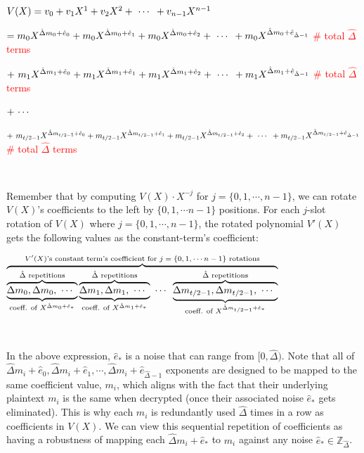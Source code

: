 $ $

$V(X) = v_0 + v_1X^1 + v_2X^2 + \text{ } \text{$\cdots$} \text{ } + v_{n-1}X^{n-1}$

\text{ } $= m_0X^{\hat{\Delta} m_0 + \hat{e}_0} + m_0X^{\hat{\Delta} m_0 + \hat{e}_1} + m_0X^{\hat{\Delta} m_0 + \hat{e}_2} + \text{ } \text{$\cdots$} \text{ } +  m_0X^{\hat{\Delta} m_0 + \hat{e}_{\hat{\Delta} - 1}}$ \textcolor{red}{ \# total $\hat{\Delta}$ terms}

\text{ } $ + \text{ } m_1X^{\hat{\Delta} m_1 + \hat{e}_0} + m_1X^{\hat{\Delta} m_1 + \hat{e}_1} + m_1X^{\hat{\Delta} m_1 + \hat{e}_2} + \text{ } \text{$\cdots$} \text{ } + m_1X^{\hat{\Delta} m_1 + \hat{e}_{\hat{\Delta} - 1}}$ \textcolor{red}{ \# total $\hat{\Delta}$ terms}

\text{ } $ + \text{ } \text{$\cdots$} \text{ } $

\text{ } $ + \text{ } m_{t/2 - 1}X^{\hat{\Delta} m_{t/2 - 1} + \hat{e}_0} + m_{t/2 - 1}X^{\hat{\Delta} m_{t/2 - 1} + \hat{e}_1} + m_{t/2 - 1}X^{\hat{\Delta} m_{t/2 - 1} + \hat{e}_2} + \text{ } \text{$\cdots$} \text{ } + m_{t/2 - 1}X^{\hat{\Delta} m_{t/2 - 1} + \hat{e}_{\hat{\Delta} - 1}}$ \textcolor{red}{ \# total $\hat{\Delta}$ terms}

$ $


Remember that by computing $V(X)\cdot X^{-j}$ for  $j= \{0, 1, \cdots , n-1\}$, we can rotate $V(X)$'s coefficients to the left by $\{0, 1, \cdots n-1 \}$ positions. For each $j$-slot rotation of $V(X)$ where $j= \{0, 1, \cdots , n-1\}$, the rotated polynomial $V'(X)$ gets the following values as the constant-term's coefficient: 

$\overbrace{\overbrace{\underbrace{\Delta m_0, \Delta m_0, \text{ } \text{$\cdots$} \text{ }}_{\text{coeff. of } X^{\hat{\Delta}m_0 + \hat{e}_*}}}^{\hat{\Delta} \text{ repetitions}} \overbrace{\underbrace{\Delta m_1, \Delta m_1, \text{ } \text{$\cdots$} \text{ }}_{\text{coeff. of } X^{\hat{\Delta}m_1 + \hat{e}_*}}}^{\hat{\Delta} \text{ repetitions}} \text{ } \text{$\cdots$} \text{ } \overbrace{\underbrace{\Delta m_{{t}/{2}-1}, \Delta m_{{t}/{2}-1}, \text{ } \text{$\cdots$} \text{ }}_{\text{coeff. of } X^{\hat{\Delta}m_{{t}/{2}-1}+ \hat{e}_*} }}^{\hat{\Delta} \text{ repetitions}}}^{\text{$V'(X)$'s constant term's coefficient for $j = \{0, 1, \cdots n-1\}$ rotations}}$ 



$ $

In the above expression, $\hat{e}_*$ is a noise that can range from $[0, \hat{\Delta})$. Note that all of $\hat\Delta m_i + \hat{e}_0, \hat\Delta m_i + \hat{e}_1, \cdots,\hat\Delta m_i + \hat{e}_{\hat\Delta - 1}$ exponents are designed to be mapped to the same coefficient value, $m_i$, which aligns with the fact that their underlying plaintext $m_i$ is the same when decrypted (once their associated noise $\hat{e}_*$ gets eliminated). This is why each $m_i$ is redundantly used $\hat\Delta$ times in a row as coefficients in $V(X)$. We can view this sequential repetition of coefficients as having a robustness of mapping each $\hat{\Delta}m_i + \hat{e}_*$ to $m_i$ against any noise $\hat{e}_* \in \mathbb{Z}_{\hat{\Delta}}$. 

